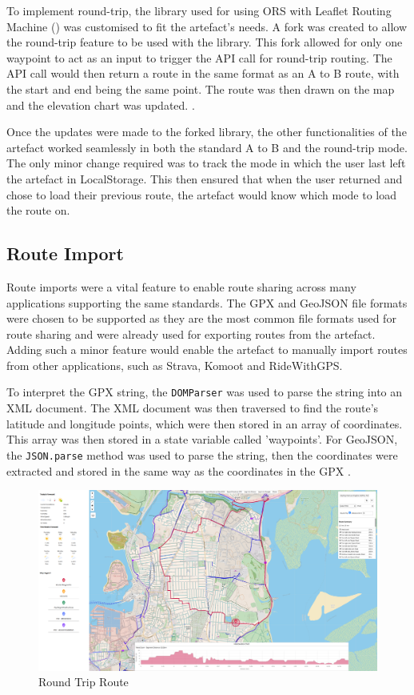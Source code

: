 To implement round-trip, the library used for using ORS with Leaflet Routing Machine (\cite{noauthor_gegewebleaflet-routing-machine-openroute_2020}) was customised to fit the artefact's needs. A fork was created to allow the round-trip feature to be used with the library. This fork allowed for only one waypoint to act as an input to trigger the API call for round-trip routing. The API call would then return a route in the same format as an A to B route, with the start and end being the same point. The route was then drawn on the map and the elevation chart was updated. .

Once the updates were made to the forked library, the other functionalities of the artefact worked seamlessly in both the standard A to B and the round-trip mode. The only minor change required was to track the mode in which the user last left the artefact in LocalStorage. This then ensured that when the user returned and chose to load their previous route, the artefact would know which mode to load the route on.

\subsection{Route Import}
\label{iteration3:route-import}

Route imports were a vital feature to enable route sharing across many applications supporting the same standards. The GPX and GeoJSON file formats were chosen to be supported as they are the most common file formats used for route sharing and were already used for exporting routes from the artefact. Adding such a minor feature would enable the artefact to manually import routes from other applications, such as Strava, Komoot and RideWithGPS.

To interpret the GPX string, the \texttt{DOMParser} was used to parse the string into an XML document. The XML document was then traversed to find the route's latitude and longitude points, which were then stored in an array of coordinates. This array was then stored in a state variable called 'waypoints'. For GeoJSON, the \texttt{JSON.parse} method was used to parse the string, then the coordinates were extracted and stored in the same way as the coordinates in the GPX .

\begingroup
\label{fig:round-trip}
\begin{figure}[h!]
  \centering
  \includegraphics[width=425px]{figures/Progress Images/Iteration-3/SR11/SR11- Round Trip functionality working.png}
  \caption{Round Trip Route}
\end{figure}

